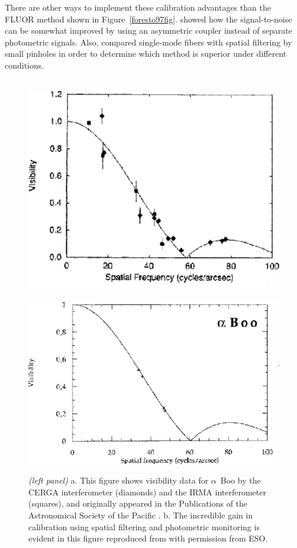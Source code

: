 \documentclass[12pt]{article}
\begin{document}
There are other ways to implement these calibration advantages than
the FLUOR method shown in Figure~\ref{foresto97fig}.
\citet{monnier2001} showed how the signal-to-noise can be somewhat
improved by using an asymmetric coupler instead of separate
photometric signals.  Also, \citet{keen2001} compared single-mode
fibers with spatial filtering by small pinholes in order to determine
which method is superior under different conditions. 

\begin{figure}[tbhp]
\begin{center}
\mbox{
\includegraphics[clip,angle=0,height=2.in]{Figures/JDM_irma93gif.eps}
\includegraphics[clip,angle=0.,height=2.in]{Figures/JDM_perrin98gif.eps}}
\caption{\footnotesize {\em (left panel)}
  a. This figure shows visibility data for $\alpha$~Boo by the CERGA
  interferometer (diamonds) and the IRMA interferometer (squares), and
  originally appeared in the Publications of the Astronomical Society
  of the Pacific \citep[Copyright 1993, Astronomical Society
  of the Pacific;][reproduced with permission of the Editors]{dyck1993}.
  b. The incredible gain in calibration using spatial filtering and
  photometric monitoring is evident in this figure reproduced from
  \citet[][Figure 2a]{perrin1998} with permission from ESO.
\label{comparecal}}
\end{center}
\end{figure}
\end{document}
